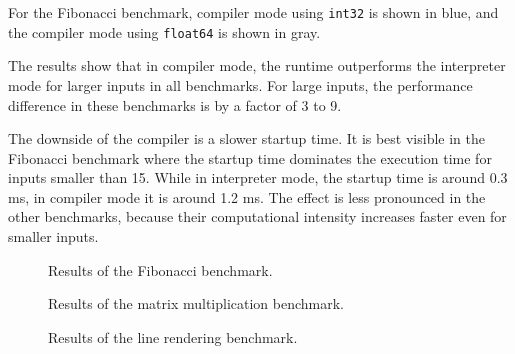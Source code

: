 For the Fibonacci benchmark, compiler mode using \texttt{int32} is shown in blue, and the compiler mode using \texttt{float64} is shown in gray.

The results show that in compiler mode, the runtime outperforms the interpreter mode for larger inputs in all benchmarks. For large inputs, the performance difference in these benchmarks is by a factor of 3 to 9.

The downside of the compiler is a slower startup time. It is best visible in the Fibonacci benchmark where the startup time dominates the execution time for inputs smaller than 15. While in interpreter mode, the startup time is around 0.3 ms, in compiler mode it is around 1.2 ms. The effect is less pronounced in the other benchmarks, because their computational intensity increases faster even for smaller inputs.

\begin{figure}
    \centering
    \caption{Results of the Fibonacci benchmark.}
    \label{fig:fibRec}
\end{figure}

\begin{figure}
    \centering
    \caption{Results of the matrix multiplication benchmark.}
    \label{fig:matmul}
\end{figure}

\begin{figure}
    \centering
    \caption{Results of the line rendering benchmark.}
    \label{fig:line}
\end{figure}
